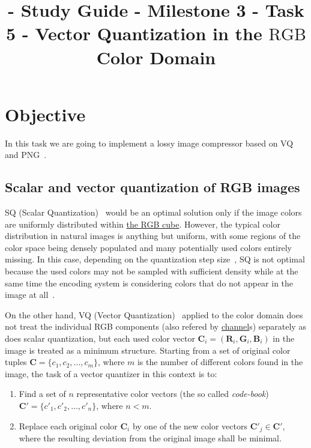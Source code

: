 

\title{\SM{} - Study Guide - Milestone 3 - Task 5 - Vector Quantization in the $\text{RGB}$ Color Domain}

\maketitle

\tableofcontents

\section{Objective}

In this task we are going to implement a lossy image compressor based
on VQ~\cite{vruiz__vector_quantization} and PNG~\cite{vruiz__PNG}.


\subsection{Scalar and vector quantization of RGB images}

SQ (Scalar
Quantization)~\cite{vruiz__scalar_quantization,sayood2017introduction}
would be an optimal solution only if the image colors are uniformly
distributed within
\href{https://en.wikipedia.org/wiki/RGB_color_model}{the RGB
  cube}. However, the typical color distribution in natural images is
anything but uniform, with some regions of the color space being
densely populated and many potentially used colors entirely
missing. In this case, depending on the quantization step
size~\cite{vruiz__signal_quantization}, SQ is not optimal because the
used colors may not be sampled with suﬃcient density while at the same
time the encoding system is considering colors that do not appear in
the image at all~\cite{burger2016digital}.

On the other hand, VQ (Vector
Quantization)~\cite{vruiz__vector_quantization,sayood2017introduction}
applied to the color domain does not treat the individual RGB
components (also refered by
\href{https://en.wikipedia.org/wiki/Color_image}{channel}s) separately
as does scalar quantization, but each used color vector ${\mathbf C}_i
= ({\mathbf R}_i, {\mathbf G}_i, {\mathbf B}_i )$ in the image is
treated as a minimum structure. Starting from a set of original color
tuples ${\mathbf C} = \{c_1, c_2, \ldots ,c_m\}$, where $m$ is the
number of different colors found in the image, the task of a vector
quantizer in this context is to:
\begin{enumerate}
\item Find a set of $n$ representative color vectors (the so called
  \emph{code-book}) ${\mathbf C}' = \{c'_1, c'_2 ,\ldots , c'_n
  \}$, where $n < m$.
\item Replace each original color ${\mathbf C}_i$ by one of the new
  color vectors ${\mathbf C}'_j\in {\mathbf C}'$, where the resulting
  deviation from the original image shall be minimal.
\end{enumerate}

